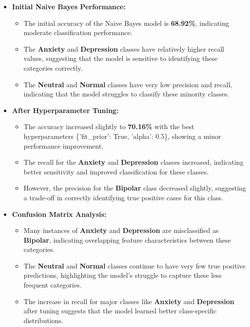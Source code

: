 \begin{itemize}
    \item \textbf{Initial Naive Bayes Performance:}
    \begin{itemize}
        \item The initial accuracy of the Naive Bayes model is \textbf{68.92\%}, indicating moderate classification performance.
        \item The \textbf{Anxiety} and \textbf{Depression} classes have relatively higher recall values, suggesting that the model is sensitive to identifying these categories correctly.
        \item The \textbf{Neutral} and \textbf{Normal} classes have very low precision and recall, indicating that the model struggles to classify these minority classes.
    \end{itemize}

    \item \textbf{After Hyperparameter Tuning:}
    \begin{itemize}
        \item The accuracy increased slightly to \textbf{70.16\%} with the best hyperparameters \{'fit\_prior': True, 'alpha': 0.5\}, showing a minor performance improvement.
        \item The recall for the \textbf{Anxiety} and \textbf{Depression} classes increased, indicating better sensitivity and improved classification for these classes.
        \item However, the precision for the \textbf{Bipolar} class decreased slightly, suggesting a trade-off in correctly identifying true positive cases for this class.
    \end{itemize}
    
    \item \textbf{Confusion Matrix Analysis:}
    \begin{itemize}
        \item Many instances of \textbf{Anxiety} and \textbf{Depression} are misclassified as \textbf{Bipolar}, indicating overlapping feature characteristics between these categories.
        \item The \textbf{Neutral} and \textbf{Normal} classes continue to have very few true positive predictions, highlighting the model’s struggle to capture these less frequent categories.
        \item The increase in recall for major classes like \textbf{Anxiety} and \textbf{Depression} after tuning suggests that the model learned better class-specific distributions.
    \end{itemize}
\end{itemize}

